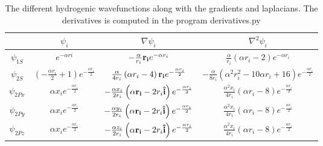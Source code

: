 		\begin{table}
			\begin{center}
				\begin{tabular}{| c | c | c | c |}
				\bottomrule
				& \( \psi_i\)	& \( \nabla\psi_i \) & \( \nabla^2\psi_i \)
				\\ \hline
					\(\psi_{1S}\)
					&
					\( e^{- \alpha ri} \)
					&
					\( - \frac{\alpha}{r_{i}} \vb{r_i}e^{- \alpha r_{i}} \)
					&
					\(\frac{\alpha}{r_{i}} \left(\alpha r_{i} - 2\right) e^{- \alpha r_{i}} \)
				\\	\hline
					\(\psi_{2S}\)
					&
					\( \left(- \frac{\alpha r_{i}}{2} + 1\right) e^{- \frac{\alpha r_{i}}{2}} \)
					&
					\( \frac{\alpha }{4 r_{i}} \left(\alpha r_{i} - 4\right) \vb{r_i} e^{- \frac{\alpha r_{i}}{2}}\)
					&
					\( - \frac{\alpha }{8 r_{i}} \left(\alpha^{2} r_{i}^{2} - 10 \alpha r_{i} + 16\right) e^{- \frac{\alpha r_{i}}{2}} \)
				\\	\hline
					\(\psi_{2Px}\)
					&
					\( \alpha x_{i} e^{- \frac{\alpha r_{i}}{2}} \)
					&
					\( - \frac{\alpha x_i}{2 r_{i}} \left(\alpha \vb{r_i} - 2 r_{i}\vu{i}\right) e^{- \frac{\alpha r_{i}}{2}} \)
					&
					\( \frac{\alpha^{2} x_{i}}{4 r_{i}} \left(\alpha r_{i} - 8\right) e^{- \frac{\alpha r_{i}}{2}} \)
				\\	\hline
					\(\psi_{2Py}\)
					&
					\( \alpha x_{i} e^{- \frac{\alpha r_{i}}{2}} \)
					&
					\( - \frac{\alpha y_i}{2 r_{i}} \left(\alpha \vb{r_i} - 2 r_{i}\vu{i}\right) e^{- \frac{\alpha r_{i}}{2}} \)
					&
					\( \frac{\alpha^{2} x_{i}}{4 r_{i}} \left(\alpha r_{i} - 8\right) e^{- \frac{\alpha r_{i}}{2}} \)
				\\	\hline
					\(\psi_{2Pz}\)
					&
					\( \alpha x_{i} e^{- \frac{\alpha r_{i}}{2}} \)
					&
					\( - \frac{\alpha z_i}{2 r_{i}} \left(\alpha \vb{r_i} - 2 r_{i}\vu{i}\right) e^{- \frac{\alpha r_{i}}{2}} \)
					&
					\( \frac{\alpha^{2} x_{i}}{4 r_{i}} \left(\alpha r_{i} - 8\right) e^{- \frac{\alpha r_{i}}{2}} \)
				\\ \toprule
				\end{tabular}
				\caption{The different hydrogenic wavefunctions along with the gradients and laplacians. The derivatives is computed in the program derivatives.py \citet{git_page}}
				\label{tab:hydrogenicWavefunctions}
			\end{center}
		\end{table}

